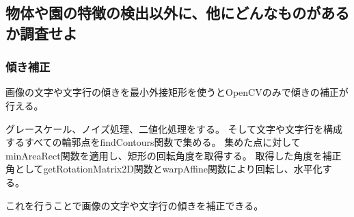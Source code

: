\documentclass{jlreq}
\begin{document}
\subsection{物体や園の特徴の検出以外に、他にどんなものがあるか調査せよ}
\subsubsection{傾き補正}
画像の文字や文字行の傾きを最小外接矩形を使うとOpenCVのみで傾きの補正が行える。

グレースケール、ノイズ処理、二値化処理をする。
そして文字や文字行を構成するすべての輪郭点をfindContours関数で集める。
集めた点に対してminAreaRect関数を適用し、矩形の回転角度を取得する。
取得した角度を補正角としてgetRotationMatrix2D関数とwarpAffine関数により回転し、水平化する。

これを行うことで画像の文字や文字行の傾きを補正できる。

%
%

\printbibliography
\end{document}
